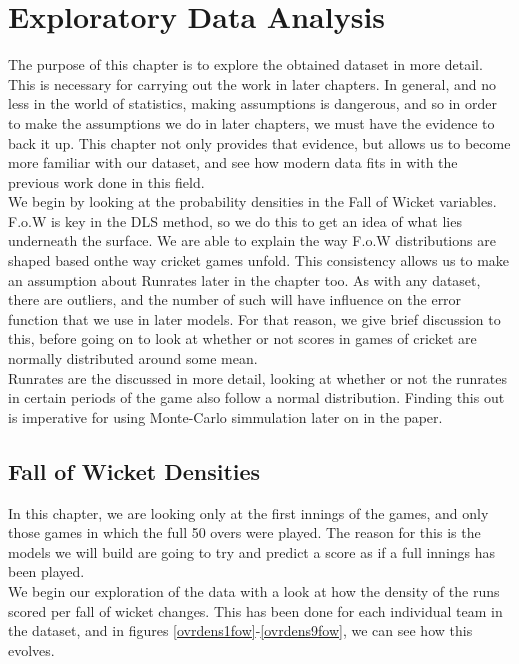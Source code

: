 \chapter{Exploratory Data Analysis}

The purpose of this chapter is to explore the obtained dataset in more detail. This is necessary for carrying out the work in later chapters. In general, and no less
in the world of statistics, making assumptions is dangerous, and so in order to make the assumptions we do in later chapters, we must have the evidence to back it up.
This chapter not only provides that evidence, but allows us to become more familiar with our dataset, and see how modern data fits in with the previous work done in this 
field. \\
We begin by looking at the probability densities in the Fall of Wicket variables. F.o.W is key in the DLS method, so we do this to get an idea of what lies underneath the
surface. We are able to explain the way F.o.W distributions are shaped based onthe way cricket games unfold. This consistency allows us to make an assumption about Runrates
later in the chapter too. 
As with any dataset, there are outliers, and the number of such will have influence on the error function that we use in later models. For that reason, we give brief discussion 
to this, before going on to look at whether or not scores in games of cricket are normally distributed around some mean. \\
Runrates are the discussed in more detail, looking at whether or not the runrates in certain periods of the game also follow a normal distribution. Finding this out is imperative
for using Monte-Carlo simmulation later on in the paper.

\section{Fall of Wicket Densities}

In this chapter, we are looking only at the first innings of the games, and only those games in which the full 50 overs were played. The 
reason for this is the models we will build are going to try and predict a score as if a full innings has been played. \\

We begin our exploration of the data with a look at how the density of the runs scored per fall of wicket changes. This has been done for each
individual team in the dataset, and in figures \ref{ovrdens1fow}-\ref{ovrdens9fow}, we can see how this evolves.  

